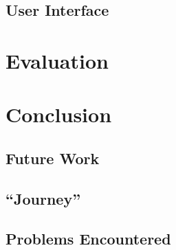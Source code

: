 \documentclass{l4proj}
\begin{document}
\section{User Interface}




\chapter{Evaluation}

\chapter{Conclusion}
\section{Future Work}
\section{``Journey''}
\section{Problems Encountered}


\end{document}
